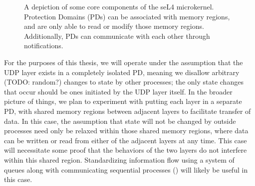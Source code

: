 \documentclass[twoside]{memoir}
\begin{document}
\begin{figure}[h]
    \centering
    \caption{A depiction of some core components of the seL4 microkernel.
    Protection Domains (PDs) can be associated with memory regions,
    and are only able to read or modify those memory regions.
    Additionally, PDs can communicate with each other through notifications.}
    \label{fig:sel4-mem-pd}
\end{figure}

For the purposes of this thesis, we will operate under the assumption that
the UDP layer exists in a completely isolated PD, meaning
we disallow arbitrary (TODO: random?) changes to state by other processes;
the only state changes that occur should be ones initiated by the UDP
layer itself.
In the broader picture of things, we plan to experiment with putting
each layer in a separate PD,
with shared memory regions between adjacent layers to facilitate transfer of data.
In this case, the assumption that state will not be changed by outside processes
need only be relaxed within those shared memory regions, where
data can be written or read from either of the adjacent layers at any time.
This case will necessitate some proof that the behaviors of the two layers
do not interfere within this shared region.
Standardizing information flow using a system of queues along with 
communicating sequential processes (\cite{csp})
will likely be useful in this case.
\end{document}

